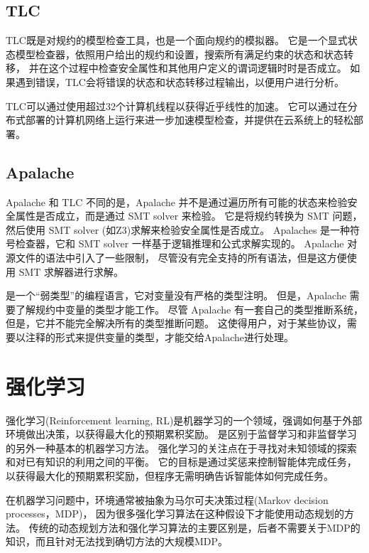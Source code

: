 \subsection{TLC}
TLC既是对\TLA 规约的模型检查工具，也是一个面向规约的模拟器。
它是一个显式状态模型检查器，依照用户给出的规约和设置，搜索所有满足约束的状态和状态转移，
并在这个过程中检查安全属性和其他用户定义的谓词逻辑时时是否成立。
如果遇到错误，TLC会将错误的状态和状态转移过程输出，以便用户进行分析。

TLC可以通过使用超过32个计算机线程以获得近乎线性的加速。
它可以通过在分布式部署的计算机网络上运行来进一步加速模型检查，并提供在云系统上的轻松部署。

\subsection{Apalache}
Apalache\cite{apalache1, apalache2} 和 TLC 不同的是，Apalache 并不是通过遍历所有可能的状态来检验安全属性是否成立，而是通过 SMT solver 来检验。
它是将\TLA 规约转换为 SMT 问题，然后使用 SMT solver (如Z3\cite{z3})求解来检验安全属性是否成立。
Apalaches 是一种符号检查器，它和 SMT solver 一样基于逻辑推理和公式求解实现的。
Apalache 对\TLA 源文件的语法中引入了一些限制，
尽管没有完全支持\TLA 的所有语法，但是这方便使用 SMT 求解器进行求解。

\TLA 是一个“弱类型”的编程语言，它对变量没有严格的类型注明。
但是，Apalache 需要了解\TLA 规约中变量的类型才能工作。
尽管 Apalache 有一套自己的类型推断系统，但是，它并不能完全解决所有的类型推断问题。
这使得用户，对于某些协议，需要以注释的形式来提供变量的类型，才能交给Apalache进行处理。


\section{强化学习}
强化学习(Reinforcement learning, RL)\cite{rl}是机器学习的一个领域，强调如何基于外部环境做出决策，以获得最大化的预期累积奖励。
是区别于监督学习和非监督学习的另外一种基本的机器学习方法。
强化学习的关注点在于寻找对未知领域的探索和对已有知识的利用之间的平衡。
它的目标是通过奖惩来控制智能体完成任务，以获得最大化的预期累积奖励，但程序无需明确告诉智能体如何完成任务。

在机器学习问题中，环境通常被抽象为马尔可夫决策过程(Markov decision processes，MDP)\cite{markov}，
因为很多强化学习算法在这种假设下才能使用动态规划的方法。
传统的动态规划方法和强化学习算法的主要区别是，后者不需要关于MDP的知识，而且针对无法找到确切方法的大规模MDP。

